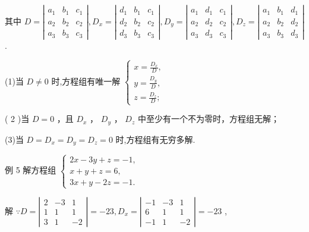 \documentclass[10pt]{article}
\begin{document}
其中 \(D = \left| \begin{array}{lll} {a}_{1} & {b}_{1} & {c}_{1} \\  {a}_{2} & {b}_{2} & {c}_{2} \\  {a}_{3} & {b}_{3} & {c}_{3} \end{array}\right| ,{D}_{x} = \left| \begin{array}{lll} {d}_{1} & {b}_{1} & {c}_{1} \\  {d}_{2} & {b}_{2} & {c}_{2} \\  {d}_{3} & {b}_{3} & {c}_{3} \end{array}\right| ,{D}_{y} = \left| \begin{array}{lll} {a}_{1} & {d}_{1} & {c}_{1} \\  {a}_{2} & {d}_{2} & {c}_{2} \\  {a}_{3} & {d}_{3} & {c}_{3} \end{array}\right| ,{D}_{z} = \left| \begin{array}{lll} {a}_{1} & {b}_{1} & {d}_{1} \\  {a}_{2} & {b}_{2} & {d}_{2} \\  {a}_{3} & {b}_{3} & {d}_{3} \end{array}\right|\) .

(1)当 \(D \neq  0\) 时,方程组有唯一解 \(\left\{  \begin{array}{l} x = \frac{{D}_{x}}{D}, \\  y = \frac{{D}_{y}}{D}, \\  z = \frac{{D}_{z}}{D}; \end{array}\right.\)

( 2 )当 \(D = 0\) ，且 \({D}_{x}\) ， \({D}_{y}\) ， \({D}_{z}\) 中至少有一个不为零时，方程组无解；

(3)当 \(D = {D}_{x} = {D}_{y} = {D}_{z} = 0\) 时,方程组有无穷多解.

例 5 解方程组 \(\left\{  \begin{array}{l} {2x} - {3y} + z =  - 1, \\  x + y + z = 6, \\  {3x} + y - {2z} =  - 1. \end{array}\right.\)

解 \(\because D = \left| \begin{matrix} 2 &  - 3 & 1 \\  1 & 1 & 1 \\  3 & 1 &  - 2 \end{matrix}\right|  =  - {23},{D}_{x} = \left| \begin{matrix}  - 1 &  - 3 & 1 \\  6 & 1 & 1 \\   - 1 & 1 &  - 2 \end{matrix}\right|  =  - {23}\) ,
\end{document}
